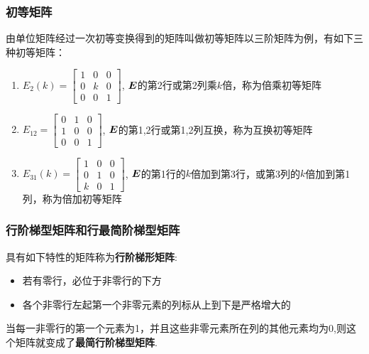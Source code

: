 \documentclass[12pt, a4paper, oneside, UTF8]{ctexbook}
\begin{document}
\subsubsection{初等矩阵}
由单位矩阵经过一次初等变换得到的矩阵叫做初等矩阵以三阶矩阵为例，有如下三种初等矩阵：
\begin{enumerate}[leftmargin=4em]
    \item $E_2(k)=\begin{bmatrix}
        1&0&0\\0&k&0\\0&0&1
    \end{bmatrix}$, $\boldsymbol{E}$的第2行或第2列乘$k$倍，称为倍乘初等矩阵
    \item $E_{12}=\begin{bmatrix}
        0&1&0\\1&0&0\\0&0&1
    \end{bmatrix}$, $\boldsymbol{E}$的第1,2行或第1,2列互换，称为互换初等矩阵
    \item $E_{31} (k)=\begin{bmatrix}
        1&0&0\\0&1&0\\k&0&1
    \end{bmatrix}$, $\boldsymbol{E}$的第1行的$k$倍加到第3行，或第3列的$k$倍加到第1列，称为倍加初等矩阵
\end{enumerate}

\subsubsection{行阶梯型矩阵和行最简阶梯型矩阵}
具有如下特性的矩阵称为\textbf{行阶梯形矩阵}:
\begin{itemize}[leftmargin=4em]
    \item 若有零行，必位于非零行的下方
    \item 各个非零行左起第一个非零元素的列标从上到下是严格增大的
\end{itemize}

当每一非零行的第一个元素为1，并且这些非零元素所在列的其他元素均为0,则这个矩阵就变成了\textbf{最简行阶梯型矩阵}.
\end{document}
